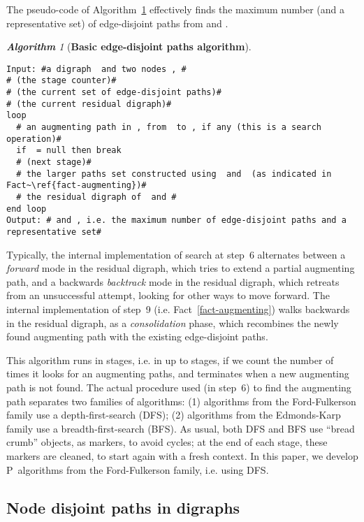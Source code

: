 \documentclass[preliminary,copyright,creativecommons]{eptcs}
\theoremstyle{remark}
\newtheorem{algorithm}[theorem]{\textbf{Algorithm}}
\begin{document}
\newpage

The pseudo-code of Algorithm~\ref{alg-basic-edge-disjoint-paths-algorithm} 
effectively finds the maximum number (and a representative set) 
of edge-disjoint paths from  and . 

\begin{algorithm}[\textbf{Basic edge-disjoint paths algorithm}]
\label{alg-basic-edge-disjoint-paths-algorithm}
~ 
\begin{lstlisting}
Input: #a digraph  and two nodes , #
# (the stage counter)#
# (the current set of edge-disjoint paths)#
# (the current residual digraph)#
loop
  # an augmenting path in , from  to , if any (this is a search operation)#
  if  = null then break 
  # (next stage)#
  # the larger paths set constructed using  and  (as indicated in Fact~\ref{fact-augmenting})#
  # the residual digraph of  and #
end loop
Output: # and , i.e. the maximum number of edge-disjoint paths and a representative set#
\end{lstlisting}

\end{algorithm}
\smallskip

Typically, the internal implementation of search at step~6 alternates between
a \emph{forward} mode in the residual digraph, 
which tries to extend a partial augmenting path,
and a backwards \emph{backtrack} mode in the residual digraph, 
which retreats from an unsuccessful attempt,
looking for other ways to move forward.
The internal implementation of step~9 (i.e. Fact~\ref{fact-augmenting}) walks backwards in the residual digraph,
as a \emph{consolidation} phase, which recombines the newly found augmenting path with the existing edge-disjoint paths.

This algorithm runs in  stages, i.e. in up to  stages,
if we count the number of times it looks for an augmenting paths,
and terminates when a new augmenting path is not found.
The actual procedure used (in step~6) to find the augmenting path separates two families of algorithms:
(1) algorithms from the Ford-Fulkerson family use a depth-first-search (DFS);
(2) algorithms from the Edmonds-Karp family use a breadth-first-search (BFS).
As usual, both DFS and BFS use ``bread crumb'' objects, as markers, to avoid cycles;
at the end of each stage, these markers are cleaned, to start again with a fresh context.
In this paper, we develop P~algorithms from the Ford-Fulkerson family, i.e. using DFS.


\subsection{Node disjoint paths in digraphs}
\label{sec-node-disjoint-paths}
\end{document}
